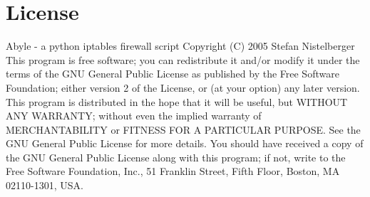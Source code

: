 \chapter{License}

Abyle - a python iptables firewall script\newline
Copyright (C) 2005  Stefan Nistelberger\newline
\newline
This program is free software; you can redistribute it and/or\newline
modify it under the terms of the GNU General Public License\newline
as published by the Free Software Foundation; either version 2\newline
of the License, or (at your option) any later version.\newline
\newline
This program is distributed in the hope that it will be useful,\newline
but WITHOUT ANY WARRANTY; without even the implied warranty of\newline
MERCHANTABILITY or FITNESS FOR A PARTICULAR PURPOSE.  See the\newline
GNU General Public License for more details.\newline
\newline
You should have received a copy of the GNU General Public License\newline
along with this program; if not, write to the Free Software\newline
Foundation, Inc., 51 Franklin Street, Fifth Floor, Boston, MA  02110-1301, USA.\newline
